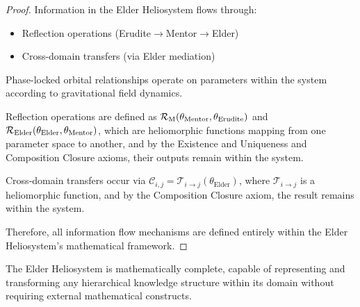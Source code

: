 \begin{proof}
Information in the Elder Heliosystem flows through:
\begin{itemize}

    \item Reflection operations (Erudite$\rightarrow$Mentor$\rightarrow$Elder)
    \item Cross-domain transfers (via Elder mediation)
\end{itemize}

Phase-locked orbital relationships operate on parameters within the system according to gravitational field dynamics.

Reflection operations are defined as $\mathcal{R}_{\text{M}}(\theta_{\text{Mentor}}, \theta_{\text{Erudite}})$ and $\mathcal{R}_{\text{Elder}}(\theta_{\text{Elder}}, \theta_{\text{Mentor}})$, which are heliomorphic functions mapping from one parameter space to another, and by the Existence and Uniqueness and Composition Closure axioms, their outputs remain within the system.

Cross-domain transfers occur via $\mathcal{C}_{i,j} = \mathcal{T}_{i \to j}(\theta_{\text{Elder}})$, where $\mathcal{T}_{i \to j}$ is a heliomorphic function, and by the Composition Closure axiom, the result remains within the system.

Therefore, all information flow mechanisms are defined entirely within the Elder Heliosystem's mathematical framework.
\end{proof}

\begin{theorem}
The Elder Heliosystem is mathematically complete, capable of representing and transforming any hierarchical knowledge structure within its domain without requiring external mathematical constructs.
\end{theorem}

